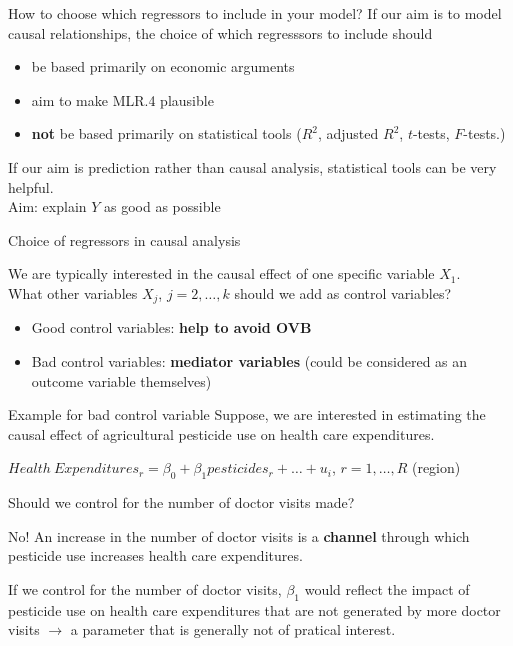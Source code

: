 \documentclass[11pt, aspectratio = 169]{beamer}
\begin{document}
\begin{frame}{How to choose which regressors to include in your model?}
If our aim is to model causal relationships, the choice of which regresssors to include should 
\begin{itemize}
    \item be based primarily on economic arguments 
    \item aim to make MLR.4 plausible
    \item \textbf{not} be based primarily on statistical tools ($R^2$, adjusted $R^2$, $t$-tests, $F$-tests.)
\end{itemize}
\bigskip \color{gray}
If our aim is prediction rather than causal analysis, statistical tools can be very helpful. \\
Aim: explain $Y$ as good as possible  
\end{frame}

\begin{frame}{Choice of regressors in causal analysis}
     
We are typically interested in the causal effect of one specific variable $X_1$. \\
What other variables $X_j$, $j = 2,…,k$ should we add as control variables?

\begin{itemize}
    \item Good control variables: \color{teal}\textbf{help to avoid OVB} \color{black}
    \item Bad control variables: \color{orange}\textbf{mediator variables} \color{black}(could be considered as an outcome variable themselves)

\end{itemize}
\end{frame}
\begin{frame}{Example for bad control variable}
Suppose, we are interested in estimating the causal effect of agricultural pesticide use on health care expenditures. 

$Health \: Expenditures_r = \beta_0 + \beta_1 pesticides_r + … + u_i$, $r = 1,…,R$ (region)

\bigskip
Should we control for the number of doctor visits made? 

\pause

No!
An increase in the number of doctor visits is a \alert{\textbf{channel}} through which pesticide use increases health care expenditures.  

If we control for the number of doctor visits, $\beta_1$ would reflect the impact of pesticide use on health care expenditures that are not generated by more doctor visits $\rightarrow$ a parameter that is generally  not of pratical interest.
\end{frame}
\end{document}
